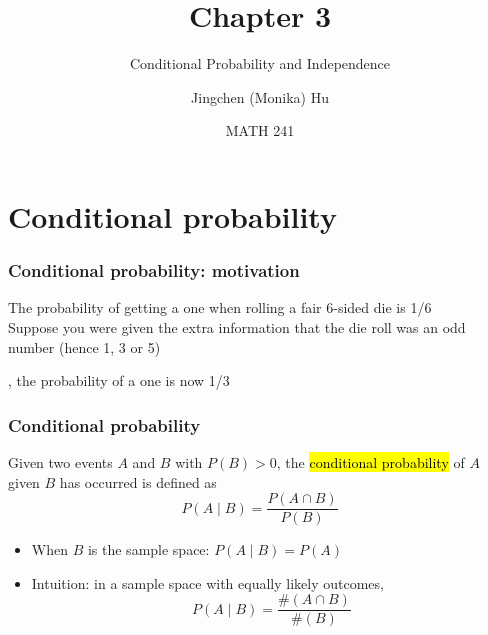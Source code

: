 \documentclass[slidestop,compress,mathserif]{beamer}
\title[Chapter 3]{Chapter 3}
\subtitle{Conditional Probability and Independence}
\author[Jingchen (Monika) Hu] %
{Jingchen (Monika) Hu}
\institute[Vassar] %
{Vassar College}
\date[MATH 241] %
{MATH 241}
\begin{document}


\begin{frame}%
\titlepage
\end{frame}

%
%
%





\section{Conditional probability}
\begin{frame}\frametitle{Conditional probability: motivation}

The probability of getting a one when rolling a fair 6-sided die is 1/6\\
\vspace{0.5cm}\pause
Suppose you were given the extra information that the die roll was an odd number (hence 1, 3 or 5)\\
\vspace{0.5cm}\pause

, the probability of a one is now 1/3


\end{frame}

\begin{frame}\frametitle{Conditional probability}

\begin{defn}
Given two events $A$ and $B$ with $P(B) > 0$, the \hl{conditional
probability} of $A$ given $B$ has occurred is defined as
\[P(A\mid B)=\frac{P(A\cap B)}{P(B)}\]
\end{defn}
\pause
\begin{itemize}
\item When $B$ is the sample space: $P(A \mid B) = P(A)$
\item Intuition: in a sample space with equally likely outcomes,
\[P(A \mid B) = \frac{\#(A \cap B)}{\#(B)}\]
\end{itemize}

\end{frame}
\end{document}

